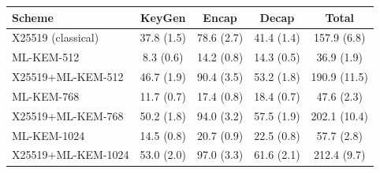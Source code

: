 \begin{tabular}{|l|c|c|c|c|}
\hline
\textbf{Scheme} & \textbf{KeyGen} & \textbf{Encap} & \textbf{Decap} & \textbf{Total} \\
\hline
X25519 (classical) & 37.8 (1.5) & 78.6 (2.7) & 41.4 (1.4) & 157.9 (6.8) \\ \hline
ML-KEM-512 & 8.3 (0.6) & 14.2 (0.8) & 14.3 (0.5) & 36.9 (1.9) \\ \hline
X25519+ML-KEM-512 & 46.7 (1.9) & 90.4 (3.5) & 53.2 (1.8) & 190.9 (11.5) \\ \hline
ML-KEM-768 & 11.7 (0.7) & 17.4 (0.8) & 18.4 (0.7) & 47.6 (2.3) \\ \hline
X25519+ML-KEM-768 & 50.2 (1.8) & 94.0 (3.2) & 57.5 (1.9) & 202.1 (10.4) \\ \hline
ML-KEM-1024 & 14.5 (0.8) & 20.7 (0.9) & 22.5 (0.8) & 57.7 (2.8) \\ \hline
X25519+ML-KEM-1024 & 53.0 (2.0) & 97.0 (3.3) & 61.6 (2.1) & 212.4 (9.7) \\ \hline
\end{tabular}
